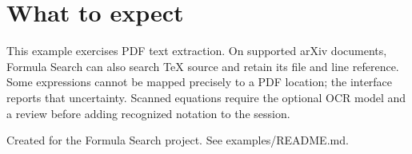 \documentclass[11pt]{article}
\begin{document}
\section*{What to expect}
This example exercises PDF text extraction. On supported arXiv documents,
Formula Search can also search TeX source and retain its file and line reference.
Some expressions cannot be mapped precisely to a PDF location; the interface
reports that uncertainty. Scanned equations require the optional OCR model
and a review before adding recognized notation to the session.

\vfill
{\small Created for the Formula Search project. See examples/README.md.}
\end{document}
